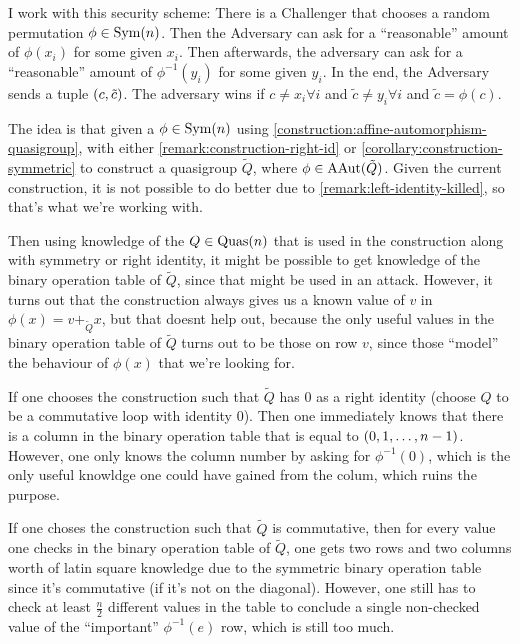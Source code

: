I work with this security scheme: There is a Challenger that chooses a random permutation \( \phi \in \operatorname{Sym}(n) \). Then the Adversary can ask for a ``reasonable'' amount of \( \phi(x_i) \) for some given \( x_i \). Then afterwards, the adversary can ask for a ``reasonable'' amount of \( \phi^{-1}(y_i) \) for some given \( y_i \). In the end, the Adversary sends a tuple \( \left( c, \tilde{c} \right) \). The adversary wins if \( c \neq x_i \forall i \) and \( \tilde{c} \neq y_i \forall i \) and \( \tilde{c} = \phi(c) \). 

The idea is that given a \( \phi \in \operatorname{Sym}(n) \) using \autoref{construction:affine-automorphism-quasigroup}, with either \autoref{remark:construction-right-id} or \autoref{corollary:construction-symmetric} to construct a quasigroup \( \tilde{Q} \), where \( \phi \in \operatorname{AAut}(\tilde{Q}) \). Given the current construction, it is not possible to do better due to \autoref{remark:left-identity-killed}, so that's what we're working with.

Then using knowledge of the \( Q \in \operatorname{Quas}(n) \) that is used in the construction along with symmetry or right identity, it might be possible to get knowledge of the binary operation table of \( \tilde{Q} \), since that might be used in an attack. However, it turns out that the construction always gives us a known value of \( v \) in \( \phi(x) = v +_{\tilde{Q}} x \), but that doesnt help out, because the only useful values in the binary operation table of \( \tilde{Q} \) turns out to be those on row \( v \), since those ``model'' the behaviour of \( \phi(x) \) that we're looking for.

If one chooses the construction such that \( \tilde{Q} \) has \( 0 \) as a right identity (choose \( Q \) to be a commutative loop with identity \( 0 \)). Then one immediately knows that there is a column in the binary operation table that is equal to \( \left( 0, 1, \dots, n - 1 \right) \). However, one only knows the column number by asking for \( \phi^{-1}(0) \), which is the only useful knowldge one could have gained from the colum, which ruins the purpose.

If one choses the construction such that \( \tilde{Q} \) is commutative, then for every value one checks in the binary operation table of \( \tilde{Q} \), one gets two rows and two columns worth of latin square knowledge due to the symmetric binary operation table since it's commutative (if it's not on the diagonal). However, one still has to check at least \( \frac{n}{2} \) different values in the table to conclude a single non-checked value of the ``important'' \( \phi^{-1}(e) \) row, which is still too much.

